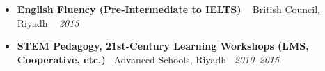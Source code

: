 \documentclass[letterpaper,10pt]{article}
\begin{document}
\begin{itemize}[label=\textcolor{gray!80}{}, leftmargin=3em, itemsep=2pt, parsep=0pt, topsep=2pt]
  \item {\footnotesize \textbf{English Fluency (Pre-Intermediate to IELTS)} \hfill 
  \quad \hspace*{1.5em}\textcolor{gray!80}{\faMapMarker*~ British Council, Riyadh}\hspace*{1.5em} \textcolor{gray!80}{\faCalendar*}~ \textit{2015}}

  \item {\footnotesize \textbf{STEM Pedagogy, 21st-Century Learning Workshops (LMS, Cooperative, etc.)} \hfill 
  \quad \hspace*{1.5em}\textcolor{gray!80}{\faMapMarker*~Advanced Schools, Riyadh} \hspace*{1.5em} \textcolor{gray!80}{\faCalendar*}~\textit{2010–2015}}

\end{itemize}
\end{document}
